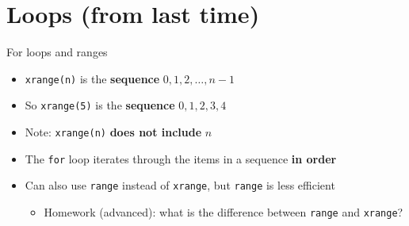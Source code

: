 \newcommand{\socrative}{
	\begin{center}
		Socrative room code: \texttt{FALCOMPED}
	\end{center}
}

\newcommand{\codeslide}[2]{
	\begin{columns}
		\begin{column}{0.48\textwidth}
			
		\end{column}
		\pause
		\begin{column}{0.48\textwidth}
			\begin{center}
				\colorbox{white}{
					\color{black}
					\begin{tabular}{|c|c|}
						\hline
						\textbf{Variable} & \textbf{Value} \\\hline
						#2
					\end{tabular}
				}
			\end{center}
		\end{column}
	\end{columns}
}

\newcommand{\trow}[1]{ & \\ \texttt{#1} & \\ & \\\hline}

\part{Loops (from last time)}
\frame{\partpage}

\begin{frame}{For loops and ranges}
	
	\begin{itemize}
		\pause\item \lstinline{xrange(n)} is the \textbf{sequence}
			$0, 1, 2, \dots, n-1$
		\pause\item So \lstinline{xrange(5)} is the \textbf{sequence}
			$0, 1, 2, 3, 4$
		\pause\item Note: \lstinline{xrange(n)} \textbf{does not include} $n$
		\pause\item The \lstinline{for} loop iterates through the items in a sequence \textbf{in order}
		\pause\item Can also use \lstinline{range} instead of \lstinline{xrange},
			but \lstinline{range} is less efficient
			\begin{itemize}
				\item Homework (advanced): what is the difference between \lstinline{range} and \lstinline{xrange}?
			\end{itemize}
	\end{itemize}
\end{frame}

